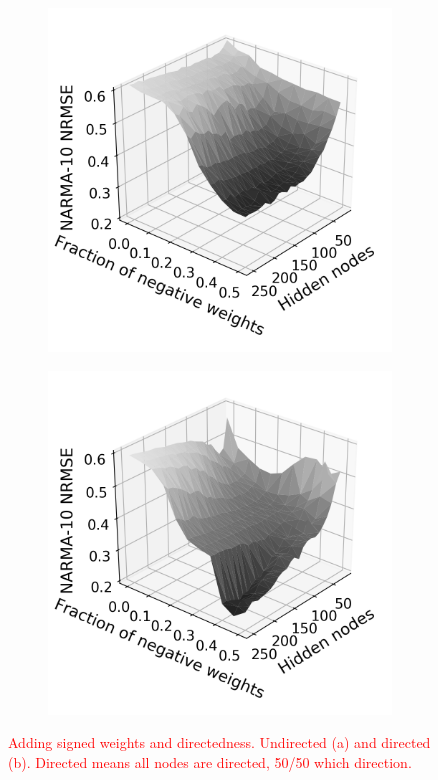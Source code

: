 \begin{figure}[t]
  \centering
  \begin{subfigure}{.49\textwidth}
    \centering
    \includegraphics[width=1.0\linewidth]{figures/perf-rest-undir.png}
    \caption{}
    \label{fig:perf-restore-a}
  \end{subfigure}
  \begin{subfigure}{.49\textwidth}
    \centering
    \includegraphics[width=1.0\linewidth]{figures/perf-rest-dir.png}
    \caption{}
    \label{fig:perf-restore-b}
  \end{subfigure}
  \caption{
    \textcolor{red}{
      Adding signed weights and directedness. Undirected (a) and directed
(b). Directed means all nodes are directed, 50/50 which direction.
    }
  }
  \label{fig:perf-restore}
\end{figure}

